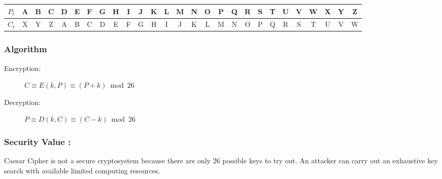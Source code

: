 \documentclass[british]{report}
\providecommand{\tabularnewline}{\\}
\begin{document}
\begin{center}
	{\scriptsize{}}%
	\begin{tabular}{|c|c|c|c|c|c|c|c|c|c|c|c|c|c|c|c|c|c|c|c|c|c|c|c|c|c|c|}
		\hline
		{\scriptsize{}$P_{t}$} & {\scriptsize{}A} & {\scriptsize{}B} & {\scriptsize{}C} & {\scriptsize{}D} & {\scriptsize{}E} & {\scriptsize{}F} & {\scriptsize{}G} & {\scriptsize{}H} & {\scriptsize{}I} & {\scriptsize{}J} & {\scriptsize{}K} & {\scriptsize{}L} & {\scriptsize{}M} & {\scriptsize{}N} & {\scriptsize{}O} & {\scriptsize{}P} & {\scriptsize{}Q} & {\scriptsize{}R} & {\scriptsize{}S} & {\scriptsize{}T} & {\scriptsize{}U} & {\scriptsize{}V} & {\scriptsize{}W} & {\scriptsize{}X} & {\scriptsize{}Y} & {\scriptsize{}Z}\tabularnewline
		\hline
		\hline
		{\scriptsize{}$C_{t}$} & {\scriptsize{}X} & {\scriptsize{}Y} & {\scriptsize{}Z} & {\scriptsize{}A} & {\scriptsize{}B} & {\scriptsize{}C} & {\scriptsize{}D} & {\scriptsize{}E} & {\scriptsize{}F} & {\scriptsize{}G} & {\scriptsize{}H} & {\scriptsize{}I} & {\scriptsize{}J} & {\scriptsize{}K} & {\scriptsize{}L} & {\scriptsize{}M} & {\scriptsize{}N} & {\scriptsize{}O} & {\scriptsize{}P} & {\scriptsize{}Q} & {\scriptsize{}R} & {\scriptsize{}S} & {\scriptsize{}T} & {\scriptsize{}U} & {\scriptsize{}V} & {\scriptsize{}W}\tabularnewline
		\hline
	\end{tabular}{\scriptsize\par}
	\par\end{center}

\begin{center}

	\par\end{center}

\subsubsection{Algorithm}
\begin{description}
	\item [{Encryption:}] $C\equiv E(k,P)\equiv(P+k)\bmod26$
	\item [{Decryption:}] $P\equiv D(k,C)\equiv(C-k)\bmod26$
\end{description}

\subsubsection{Security Value :}

Caesar Cipher is not a secure cryptosystem because there are only
26 possible keys to try out. An attacker can carry out an exhaustive
key search with available limited computing resources.
\end{document}

